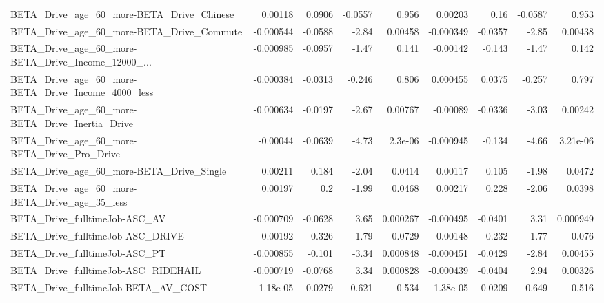 \begin{tabular}{lrrrrrrrr}
BETA\_Drive\_age\_60\_more-BETA\_Drive\_Chinese          &     0.00118 &       0.0906 &  -0.0557 &    0.956 &    0.00203 &        0.16 &      -0.0587 &         0.953 \\
BETA\_Drive\_age\_60\_more-BETA\_Drive\_Commute          &   -0.000544 &      -0.0588 &    -2.84 &  0.00458 &  -0.000349 &     -0.0357 &        -2.85 &       0.00438 \\
BETA\_Drive\_age\_60\_more-BETA\_Drive\_Income\_12000\_... &   -0.000985 &      -0.0957 &    -1.47 &    0.141 &   -0.00142 &      -0.143 &        -1.47 &         0.142 \\
BETA\_Drive\_age\_60\_more-BETA\_Drive\_Income\_4000\_less &   -0.000384 &      -0.0313 &   -0.246 &    0.806 &   0.000455 &      0.0375 &       -0.257 &         0.797 \\
BETA\_Drive\_age\_60\_more-BETA\_Drive\_Inertia\_Drive    &   -0.000634 &      -0.0197 &    -2.67 &  0.00767 &   -0.00089 &     -0.0336 &        -3.03 &       0.00242 \\
BETA\_Drive\_age\_60\_more-BETA\_Drive\_Pro\_Drive        &    -0.00044 &      -0.0639 &    -4.73 &  2.3e-06 &  -0.000945 &      -0.134 &        -4.66 &      3.21e-06 \\
BETA\_Drive\_age\_60\_more-BETA\_Drive\_Single           &     0.00211 &        0.184 &    -2.04 &   0.0414 &    0.00117 &       0.105 &        -1.98 &        0.0472 \\
BETA\_Drive\_age\_60\_more-BETA\_Drive\_age\_35\_less      &     0.00197 &          0.2 &    -1.99 &   0.0468 &    0.00217 &       0.228 &        -2.06 &        0.0398 \\
BETA\_Drive\_fulltimeJob-ASC\_AV                      &   -0.000709 &      -0.0628 &     3.65 & 0.000267 &  -0.000495 &     -0.0401 &         3.31 &      0.000949 \\
BETA\_Drive\_fulltimeJob-ASC\_DRIVE                   &    -0.00192 &       -0.326 &    -1.79 &   0.0729 &   -0.00148 &      -0.232 &        -1.77 &         0.076 \\
BETA\_Drive\_fulltimeJob-ASC\_PT                      &   -0.000855 &       -0.101 &    -3.34 & 0.000848 &  -0.000451 &     -0.0429 &        -2.84 &       0.00455 \\
BETA\_Drive\_fulltimeJob-ASC\_RIDEHAIL                &   -0.000719 &      -0.0768 &     3.34 & 0.000828 &  -0.000439 &     -0.0404 &         2.94 &       0.00326 \\
BETA\_Drive\_fulltimeJob-BETA\_AV\_COST                &    1.18e-05 &       0.0279 &    0.621 &    0.534 &   1.38e-05 &      0.0209 &        0.649 &         0.516 \\

\end{tabular}
